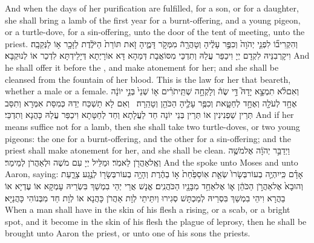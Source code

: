 {And when the days of her purification are fulfilled, for a son, or for a daughter, she shall bring a lamb of the first year for a burnt-offering, and a young pigeon, or a turtle-dove, for a sin-offering, unto the door of the tent of meeting, unto the priest.}{}
{וְהִקְרִיב֞וֹ לִפְנֵ֤י יְהֹוָה֙ וְכִפֶּ֣ר עָלֶ֔יהָ וְטָהֲרָ֖הֿ מִמְּקֹ֣ר דָּמֶ֑יהָ זֹ֤את תּוֹרַת֙ הַיֹּלֶ֔דֶת לַזָּכָ֖ר א֥וֹ לַנְּקֵבָֽה׃}
{וִיקָרְבִנֵּיהּ לִקְדָם יְיָ וִיכַפַּר עֲלַהּ וְתִדְכֵּי מִסּוֹאֲבָת דְּמַהָא דָּא אוֹרָיְתָא דְּיָלֵידְתָּא לִדְכַר אוֹ לְנוּקְבָּא׃}
{And he shall offer it before the \lord, and make atonement for her; and she shall be cleansed from the fountain of her blood. This is the law for her that beareth, whether a male or a female.}{}
{וְאִם\maqqaf לֹ֨א תִמְצָ֣א יָדָהּ֮ דֵּ֣י שֶׂה֒ וְלָקְחָ֣ה שְׁתֵּֽי\maqqaf תֹרִ֗ים א֤וֹ שְׁנֵי֙ בְּנֵ֣י יוֹנָ֔ה אֶחָ֥ד לְעֹלָ֖ה וְאֶחָ֣ד לְחַטָּ֑את וְכִפֶּ֥ר עָלֶ֛יהָ הַכֹּהֵ֖ן וְטָהֵֽרָה׃ \petucha }
{וְאִם לָא תַשְׁכַּח יְדַהּ כְּמִסַּת אִמְּרָא וְתִסַּב ‏‏תְּרֵין שַׁפְנִינִין אוֹ תְּרֵין בְּנֵי יוֹנָה חַד לַעֲלָתָא וְחַד לְחַטָּתָא וִיכַפַּר עֲלַהּ כָּהֲנָא וְתִדְכֵּי׃}
{And if her means suffice not for a lamb, then she shall take two turtle-doves, or two young pigeons: the one for a burnt-offering, and the other for a sin-offering; and the priest shall make atonement for her, and she shall be clean.}{}
\newperek
{}%
{וַיְדַבֵּ֣ר יְהֹוָ֔ה אֶל\maqqaf מֹשֶׁ֥ה וְאֶֽל\maqqaf אַהֲרֹ֖ן לֵאמֹֽר׃}
{וּמַלֵּיל יְיָ עִם מֹשֶׁה וּלְאַהֲרֹן לְמֵימַר׃}
{And the \lord\space spoke unto Moses and unto Aaron, saying:}{}
{אָדָ֗ם כִּֽי\maqqaf יִהְיֶ֤ה בְעוֹר\maqqaf בְּשָׂרוֹ֙ שְׂאֵ֤ת אֽוֹ\maqqaf סַפַּ֙חַת֙ א֣וֹ בַהֶ֔רֶת וְהָיָ֥ה בְעוֹר\maqqaf בְּשָׂר֖וֹ לְנֶ֣גַע צָרָ֑עַת וְהוּבָא֙ אֶל\maqqaf אַהֲרֹ֣ן הַכֹּהֵ֔ן א֛וֹ אֶל\maqqaf אַחַ֥ד מִבָּנָ֖יו הַכֹּהֲנִֽים׃}
{אֱנָשׁ אֲרֵי יְהֵי בִמְשַׁךְ בִּשְׂרֵיהּ עָמְקָא אוֹ עֶדְיָא אוֹ בַהֲרָא וִיהֵי בִמְשַׁךְ בִּסְרֵיהּ לְמַכְתָּשׁ סְגִירוּ וְיִתֵּיתֵי לְוָת אַהֲרֹן כָּהֲנָא אוֹ לְוָת חַד מִבְּנוֹהִי כָּהֲנַיָּא׃}
{When a man shall have in the skin of his flesh a rising, or a scab, or a bright spot, and it become in the skin of his flesh the plague of leprosy, then he shall be brought unto Aaron the priest, or unto one of his sons the priests.}{}
